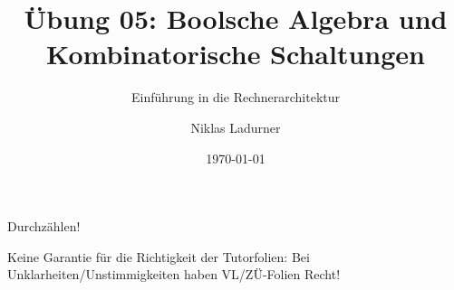 \documentclass[
  german,            %
  aspectratio=169,    %
]{tumbeamer}
\title{Übung 05: Boolsche Algebra und \\Kombinatorische Schaltungen}
\subtitle{Einführung in die Rechnerarchitektur}
\author{Niklas Ladurner}
\institute{\theChairName\\\theDepartmentName\\\theUniversityName}
\date[\today]{\today}
\begin{document}
\maketitle

\begin{frame}[c]{}{}
  \begin{center}
    \LARGE  Durchzählen!
  \end{center}
\end{frame}

\begin{frame}[c]{}{}
  \begin{center}
    \LARGE  Keine Garantie für die Richtigkeit der Tutorfolien: Bei Unklarheiten/Unstimmigkeiten
    haben VL/ZÜ-Folien Recht!
  \end{center}
\end{frame}
\end{document}
